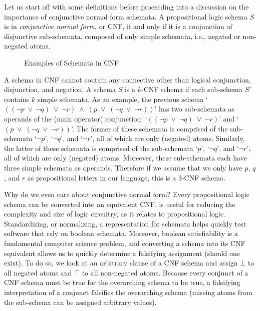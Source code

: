 Let us start off with some definitions before proceeding into a discussion on the importance of conjunctive normal form schemata. A propositional logic schema $S$ is in \textit{conjunctive normal form}, or CNF, if and only if it is a conjunction of disjunctive sub-schemata, composed of only simple schemata, i.e., negated or non-negated atoms.

\begin{figure}[H]
\begin{center}
\setlength{\fboxsep}{.5em}
\noindent{}
\end{center}
\caption{Examples of Schemata in CNF}
\end{figure}

A schema in CNF cannot contain any connective other than logical conjunction, disjunction, and negation. A schema $S$ is a $k$-CNF schema if each sub-schema $S'$ contains $k$ simple schemata. As an example, the previous schema `$((\lnot{p}\;\lor\;\lnot{q})\;\lor\;\lnot{r})\;\land\;(p\;\lor\;(\lnot{q}\;\lor\;\lnot{r}))$' has two sub-schemata as operands of the (main operator) conjunction: `$((\lnot{p}\;\lor\;\lnot{q})\;\lor\;\lnot{r})$' and `$(p\;\lor\;(\lnot{q}\;\lor\;\lnot{r}))$'. The former of these schemata is comprised of the sub-schemata `$\lnot{p}$', `$\lnot{q}$', and `$\lnot{r}$', all of which are only (negated) atoms. Similarly, the latter of these schemata is comprised of the sub-schemata `$p$', `$\lnot{q}$', and `$\lnot{r}$', all of which are only (negated) atoms. Moreover, these sub-schemata each have three simple schemata as operands. Therefore if we assume that we only have $p$, $q$, and $r$ as propositional letters in our language, this is a $3$-CNF schema. 

Why do we even care about conjunctive normal form? Every propositional logic schema can be converted into an equivalent CNF. is useful for reducing the complexity and size of logic circuitry, as it relates to propositional logic. Standardizing, or normalizing, a representation for schemata helps quickly test software that rely on boolean schemata. Moreover, boolean satisfiability is a fundamental computer science problem, and converting a schema into its CNF equivalent allows us to quickly determine a falsifying assignment (should one exist). To do so, we look at an arbitrary clause of a CNF schema and assign $\bot$ to all negated atoms and $\top$ to all non-negated atoms. Because every conjunct of a CNF schema must be true for the overarching schema to be true, a falsifying interpretation of a conjunct falsifies the overarching schema (missing atoms from the sub-schema can be assigned arbitrary values). 

